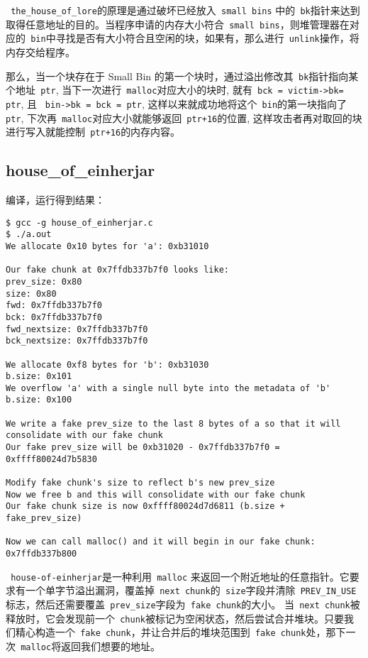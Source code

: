 \verb+ the_house_of_lore+的原理是通过破坏已经放入\verb+ small bins+ 中的\verb+ bk+指针来达到取得任意地址的目的。当程序申请的内存大小符合\verb+ small bins+，则堆管理器在对应的\verb+ bin+中寻找是否有大小符合且空闲的块，如果有，那么进行\verb+ unlink+操作，将内存交给程序。

那么，当一个块存在于 Small Bin 的第一个块时，通过溢出修改其\verb+ bk+指针指向某个地址\verb+ ptr+, 当下一次进行\verb+ malloc+对应大小的块时, 就有\verb+ bck = victim->bk= ptr+, 且 \verb+ bin->bk = bck = ptr+, 这样以来就成功地将这个\verb+ bin+的第一块指向了\verb+ ptr+, 下次再\verb+ malloc+对应大小就能够返回\verb| ptr+16|的位置, 这样攻击者再对取回的块进行写入就能控制\verb$ ptr+16$的内存内容。

\subsection{house\_of\_einherjar}

编译，运行得到结果：
\begin{verbatim}
$ gcc -g house_of_einherjar.c 
$ ./a.out 
We allocate 0x10 bytes for 'a': 0xb31010

Our fake chunk at 0x7ffdb337b7f0 looks like:
prev_size: 0x80
size: 0x80
fwd: 0x7ffdb337b7f0
bck: 0x7ffdb337b7f0
fwd_nextsize: 0x7ffdb337b7f0
bck_nextsize: 0x7ffdb337b7f0

We allocate 0xf8 bytes for 'b': 0xb31030
b.size: 0x101
We overflow 'a' with a single null byte into the metadata of 'b'
b.size: 0x100

We write a fake prev_size to the last 8 bytes of a so that it will consolidate with our fake chunk
Our fake prev_size will be 0xb31020 - 0x7ffdb337b7f0 = 0xffff80024d7b5830

Modify fake chunk's size to reflect b's new prev_size
Now we free b and this will consolidate with our fake chunk
Our fake chunk size is now 0xffff80024d7d6811 (b.size + fake_prev_size)

Now we can call malloc() and it will begin in our fake chunk: 0x7ffdb337b800
\end{verbatim}

\verb+ house-of-einherjar+是一种利用\verb+ malloc+ 来返回一个附近地址的任意指针。它要求有一个单字节溢出漏洞，覆盖掉\verb+ next chunk+的\verb+ size+字段并清除\verb+ PREV_IN_USE+标志，然后还需要覆盖\verb+ prev_size+字段为\verb+ fake chunk+的大小。
当\verb+ next chunk+被释放时，它会发现前一个\verb+ chunk+被标记为空闲状态，然后尝试合并堆块。只要我们精心构造一个\verb+ fake chunk+，并让合并后的堆块范围到\verb+ fake chunk+处，那下一次\verb+ malloc+将返回我们想要的地址。

